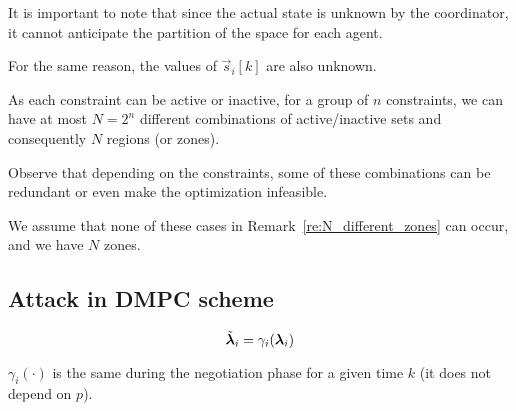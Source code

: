 \documentclass{ifacconf}  %
\begin{document}
\begin{challenge}\label{ch:partition_unknown}
  It is important to note that since the actual state is unknown by the coordinator, it cannot anticipate the partition of the space for each agent.
\end{challenge}
\begin{challenge}\label{ch:zone_unknown}
 For the same reason, the values of $\vec{s}_{i}[k]$ are also unknown.
\end{challenge}

 As each constraint can be active or inactive, for a group of $n$ constraints, we can have at most $N=2^{n}$ different combinations of active/inactive sets and consequently $N$ regions (or zones).
 \begin{remark}\label{re:N_different_zones}
  Observe that depending on the constraints, some of these combinations can be redundant or even make the optimization infeasible.
 \end{remark}
 \begin{assumption}
   We assume that none of these cases in Remark~\ref{re:N_different_zones} can occur, and we have $N$ zones.
 \end{assumption}


\subsection{Attack in DMPC scheme}\label{ssec:attack}

\begin{equation}\label{eq:cheating}
\tilde{\boldsymbol{\lambda}}_i=\gamma_{i}(\boldsymbol{\lambda}_i)
\end{equation}

\begin{assumption}
  $\gamma_{i}(\cdot)$ is the same during the negotiation phase for a given time $k$ (it does not depend on $p$).
\end{assumption}
\end{document}
